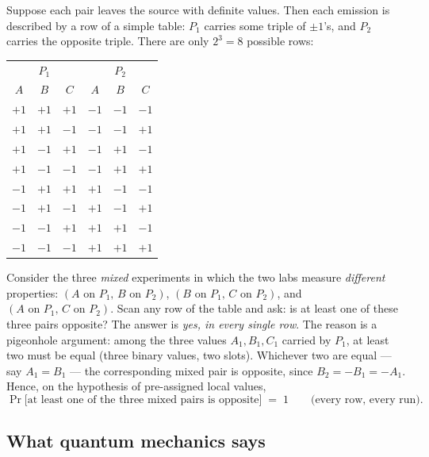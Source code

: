 \documentclass[11pt,a4paper]{article}
\theoremstyle{remark}
\begin{document}
Suppose each pair leaves the source with definite values. Then each emission is
described by a row of a simple table: $P_1$ carries some triple of $\pm1$'s, and
$P_2$ carries the opposite triple. There are only $2^3 = 8$ possible rows:

\begin{center}
\begin{tabular}{ccc|ccc}
\toprule
\multicolumn{3}{c|}{$P_1$} & \multicolumn{3}{c}{$P_2$}\\
$A$ & $B$ & $C$ & $A$ & $B$ & $C$\\
\midrule
$+1$ & $+1$ & $+1$ & $-1$ & $-1$ & $-1$\\
$+1$ & $+1$ & $-1$ & $-1$ & $-1$ & $+1$\\
$+1$ & $-1$ & $+1$ & $-1$ & $+1$ & $-1$\\
$+1$ & $-1$ & $-1$ & $-1$ & $+1$ & $+1$\\
$-1$ & $+1$ & $+1$ & $+1$ & $-1$ & $-1$\\
$-1$ & $+1$ & $-1$ & $+1$ & $-1$ & $+1$\\
$-1$ & $-1$ & $+1$ & $+1$ & $+1$ & $-1$\\
$-1$ & $-1$ & $-1$ & $+1$ & $+1$ & $+1$\\
\bottomrule
\end{tabular}
\end{center}

Consider the three \emph{mixed} experiments in which the two labs measure
\emph{different} properties: $(A\text{ on }P_1,\,B\text{ on }P_2)$,
$(B\text{ on }P_1,\,C\text{ on }P_2)$, and $(A\text{ on }P_1,\,C\text{ on }P_2)$.
Scan any row of the table and ask: is at least one of these three pairs opposite?
The answer is \emph{yes, in every single row}. The reason is a pigeonhole
argument: among the three values $A_1,B_1,C_1$ carried by $P_1$, at least two must
be equal (three binary values, two slots). Whichever two are equal --- say
$A_1=B_1$ --- the corresponding mixed pair is opposite, since
$B_2=-B_1=-A_1$. Hence, on the hypothesis of pre-assigned local values,
\begin{equation}
  \Pr\bigl[\text{at least one of the three mixed pairs is opposite}\bigr] \;=\; 1
  \qquad\text{(every row, every run).}
  \label{eq:lhv}
\end{equation}

\subsection{What quantum mechanics says}
\end{document}
